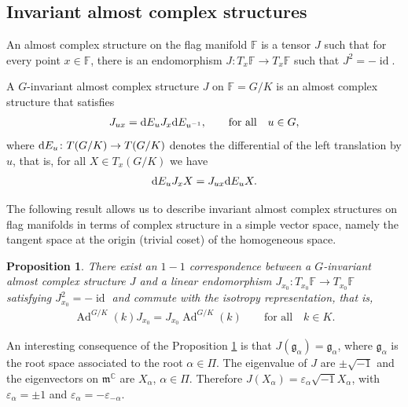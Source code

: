 \documentclass[pdftex]{sigma}%
\numberwithin{equation}{section}
\newtheorem{Proposition}[Theorem]{Proposition}
 { \theoremstyle{definition}
\newtheorem{Definition}[Theorem]{Definition}
\newtheorem{Question}[Theorem]{Question}
\newtheorem*{Notation}{Notation}
\newtheorem{Example}[Theorem]{Example}
\newtheorem{Remark}[Theorem]{Remark} }
\DeclareMathOperator{\Ad}{Ad}
\DeclareMathOperator{\id}{id}
\begin{document}
\subsection{Invariant almost complex structures}
\begin{Definition}
An almost complex structure on the flag manifold $\mathbb{F}$ is a tensor $J$ such that for every point $x\in \mathbb{F}$, there is an endomorphism $J\colon T_{x}\mathbb{F}\longrightarrow T_{x}\mathbb{F}$ such that $J^{2}=-\id$.
\end{Definition}

\begin{Definition}
A $G$-invariant almost complex structure $J$ on $\mathbb{F}=G/K$ is an almost complex structure that satisfies
\begin{gather*}
J_{ux}={\rm d}E_{u}J_{x}{\rm d}E_{u^{-1}},\qquad \text{for all} \quad u\in G,
\end{gather*}
where ${\rm d}E_{u}\colon T(G/K) \to T(G/K)$ denotes the differential of the left translation by $u$, that is, for all $X\in T_{x}(G/K)$ we have
\begin{gather*}
{\rm d}E_{u}J_{x}X=J_{ux}{\rm d}E_{u}X.
\end{gather*}
\end{Definition}

The following result allows us to describe invariant almost complex structures on flag mani\-folds in terms of complex structure in a simple vector space, namely the tangent space at the origin (trivial coset) of the homogeneous space.

\begin{Proposition} \label{prop-corresp-iacs}
There exist an $1-1$ correspondence between a $G$-invariant almost complex structure $J$ and a linear endomorphism $J_{x_{0}}\colon  T_{x_{0}}\mathbb{F} \to T_{x_{0}}\mathbb{F}$ satisfying $J_{x_{0}}^2=-\id$ and commute with the isotropy representation, that is,
\begin{gather*}
\Ad^{G/K}(k)J_{x_{0}}=J_{x_{0}}\Ad^{G/K}(k) \qquad \text{for all} \quad k\in K.
\end{gather*}
\end{Proposition}

An interesting consequence of the Proposition \ref{prop-corresp-iacs} is that $J(\mathfrak{g}_{\alpha})=\mathfrak{g}_{\alpha}$, where $\mathfrak{g}_\alpha$ is the root space associated to the root $\alpha \in \Pi$. The eigenvalue of $J$ are $\pm \sqrt{-1}$ and the eigenvectors on $\mathfrak{m}^{\mathbb{C}}$ are $X_{\alpha}$, $\alpha\in\Pi$. Therefore $J(X_{\alpha})= \varepsilon_{\alpha} \sqrt{-1} X_{\alpha}$, with $\varepsilon_{\alpha}=\pm 1$ and $\varepsilon_{\alpha}=-\varepsilon_{-\alpha}$.
\end{document}
